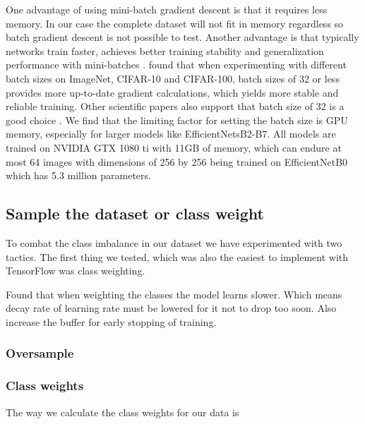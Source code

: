 \documentclass[thesis.tex]{subfiles}
\begin{document}
One advantage of using mini-batch gradient descent is that it requires less memory. In our case the complete dataset will not fit in memory regardless so batch gradient descent is not possible to test. Another advantage is that typically networks train faster, achieves better training stability and generalization performance with mini-batches \cite{RevisitingSmall18}. \citeauthor{RevisitingSmall18} found that when experimenting with different batch sizes on ImageNet, CIFAR-10 and CIFAR-100, batch sizes of 32 or less provides more up-to-date gradient calculations, which yields more stable and reliable training. Other scientific papers also support that batch size of 32 is a good choice \cite{PracticalRecommendations12, GeneralInefficiency03}.
We find that the limiting factor for setting the batch size is GPU memory, especially for larger models like EfficientNetsB2-B7. All models are trained on NVIDIA GTX 1080 ti with 11GB of memory, which can endure at most 64 images with dimensions of 256 by 256 being trained on EfficientNetB0 which has 5.3 million parameters.



\subsection{Sample the dataset or class weight}
To combat the class imbalance in our dataset we have experimented with two tactics. The first thing we tested, which was also the easiest to implement with TensorFlow was class weighting. 


Found that when weighting the classes the model learns slower. Which means decay rate of learning rate must be lowered for it not to drop too soon. Also increase the buffer for early stopping of training.


\subsubsection{Oversample}


\subsubsection{Class weights}
The way we calculate the class weights for our data is
\[
	
\]
\end{document}
